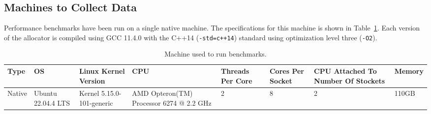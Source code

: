 


\subsection{Machines to Collect Data}

Performance benchmarks have been run on a single native machine. The specifications for this machine is shown in Table~\ref{table:machine}. Each version of the allocator is compiled using GCC 11.4.0 with the C++14 (\texttt{-std=c++14}) standard using optimization level three (\texttt{-O2}).

\begin{table}[H]
\centering
\footnotesize
\begin{tabular}{p{1cm}p{2in}p{20mm}p{1cm}p{50pt}p{2cm}p{1cm}p{1cm}p{2cm}p{15mm}}
Type   & \multicolumn{3}{p{1cm}}{OS}                 & Linux Kernel Version      & CPU                                      & Threads Per Core & Cores Per Socket & CPU Attached To Number Of Stockets & Memory \\
\hline
Native & \multicolumn{3}{p{1cm}}{Ubuntu 22.04.4 LTS} & Kernel 5.15.0-101-generic & AMD Opteron(TM) Processor 6274 @ 2.2 GHz & 2                & 8                & 2                                  & 110GB 
\end{tabular}
\caption{Machine used to run benchmarks.}
\label{table:machine}
\end{table}



